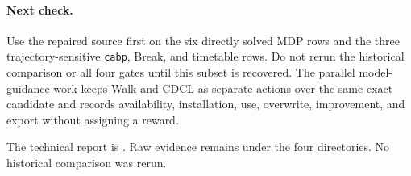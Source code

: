 \documentclass{article}
\begin{document}
\paragraph{Next check.}
Use the repaired source first on the six directly solved MDP rows and the three
trajectory-sensitive \texttt{cabp}, Break, and timetable rows.  Do not rerun the
historical comparison or all four gates until this subset is recovered.  The
parallel model-guidance work keeps Walk and CDCL as separate actions over the
same exact candidate and records availability, installation, use, overwrite,
improvement, and export without assigning a reward.

The technical report is
.
Raw evidence remains under the four
 directories.  No
historical comparison was rerun.
\end{document}
